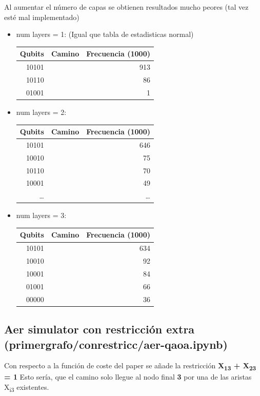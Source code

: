 \documentclass[letterpaper]{article}
\begin{document}
Al aumentar el número de capas se obtienen resultados mucho peores (tal vez esté mal implementado)
\begin{itemize}
\item num layers = 1: (Igual que tabla de estadisticas normal)
\begin{center}
\begin{tabular}{|r|l|r|}
\hline
\textbf{Qubits} & \textbf{Camino} & \textbf{Frecuencia (1000)}\\
\hline
10101 &  & 913\\
10110 &  & 86\\
01001 &  & 1\\
\hline
\end{tabular}
\end{center}

\item num layers = 2:
\begin{center}
\begin{tabular}{|r|l|r|}
\hline
\textbf{Qubits} & \textbf{Camino} & \textbf{Frecuencia (1000)}\\
\hline
10101 &  & 646\\
10010 &  & 75\\
10110 &  & 70\\
10001 &  & 49\\
\ldots{} &  & \ldots{}\\
\hline
\end{tabular}
\end{center}

\item num layers = 3:
\begin{center}
\begin{tabular}{|r|l|r|}
\hline
\textbf{Qubits} & \textbf{Camino} & \textbf{Frecuencia (1000)}\\
\hline
10101 &  & 634\\
10010 &  & 92\\
10001 &  & 84\\
01001 &  & 66\\
00000 &  & 36\\
\hline
\end{tabular}
\end{center}
\end{itemize}

\subsection{Aer simulator con restricción extra  (primer\textunderscore grafo/con\textunderscore restricc/aer-qaoa.ipynb)}
\label{sec:orgbc480f9}
Con respecto a la función de coste del paper se añade la restricción\newline
    \textbf{X\textsubscript{13} + X\textsubscript{23} = 1}\newline
Esto sería, que el camino solo llegue al nodo final \textbf{3} por una de las aristas X\textsubscript{i3} existentes.
\end{document}
